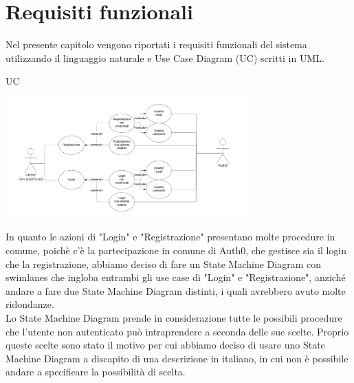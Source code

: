 \section{Requisiti funzionali}
\label{secD2:RequisitiFunzionali}

Nel presente capitolo vengono riportati i requisiti funzionali del sistema utilizzando il linguaggio naturale e Use Case Diagram (UC) scritti in UML.

\begin{listaPersonale}{UC}

    \begin{center}
        \includegraphics[width=0.7\textwidth]{img/Diagrammi/UseCases/AccessoRegistrazione.png}
    \end{center}
    In quanto le azioni di "Login" e "Registrazione" presentano molte procedure in comune, poichè c'è la partecipazione in comune di Auth0, che gestisce sia il login che la registrazione, abbiamo deciso di fare un State Machine Diagram con swimlanes che ingloba entrambi gli use case di "Login" e "Registrazione", anziché andare a fare due State Machine Diagram distinti, i quali avrebbero avuto molte ridondanze. \\ Lo State Machine Diagram prende in considerazione tutte le possibili procedure che l'utente non autenticato  può intraprendere a seconda delle sue scelte. Proprio queste scelte sono stato il motivo per cui abbiamo deciso di usare uno State Machine Diagram a discapito di una descrizione in italiano, in cui non è possibile andare a specificare la possibilità di scelta.


\end{listaPersonale}
